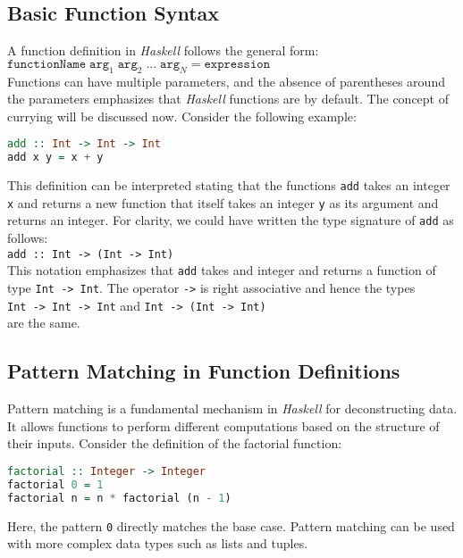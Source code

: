 \subsection{Basic Function Syntax}
A function definition in \textsl{Haskell} follows the general form:
\\[0.2cm]
\hspace*{1.3cm}
$\texttt{functionName} \;\mathtt{arg}_1 \;\mathtt{arg}_2\; ... \;\mathtt{arg}_N = \mathtt{expression}$
\\[0.2cm]
Functions can have multiple parameters, and the absence of parentheses around the parameters emphasizes that
\textsl{Haskell} functions are  by default.  The concept of currying will be discussed now.
Consider the following example: 
\begin{lstlisting}[style=haskellstyle, language=Haskell]
add :: Int -> Int -> Int 
add x y = x + y 
\end{lstlisting}
This definition can be interpreted stating that the functions \texttt{add} takes an integer \texttt{x} and
returns a new function that itself takes an integer \texttt{y} as its argument and returns an integer.   For
clarity, we could have written the type signature of \texttt{add} as follows:
\\[0.2cm]
\hspace*{1.3cm}
\texttt{add :: Int -> (Int -> Int)}
\\[0.2cm]
This notation emphasizes that \texttt{add} takes and integer and returns a function of type \texttt{Int -> Int}.
The operator \texttt{->} is right associative and hence the types
\\[0.2cm]
\hspace*{1.3cm}
\texttt{Int -> Int -> Int} \quad and \quad \texttt{Int -> (Int -> Int)}
\\[0.2cm]
are the same.


\subsection{Pattern Matching in Function Definitions}
Pattern matching is a fundamental mechanism in \textsl{Haskell} for deconstructing data. It allows functions to perform
different computations based on the structure of their inputs. Consider the definition of the factorial
function: 
\begin{lstlisting}[style=haskellstyle, language=Haskell]
factorial :: Integer -> Integer
factorial 0 = 1
factorial n = n * factorial (n - 1)
\end{lstlisting}
Here, the pattern \texttt{0} directly matches the base case. Pattern matching can be used with more complex data types such as lists and tuples.

